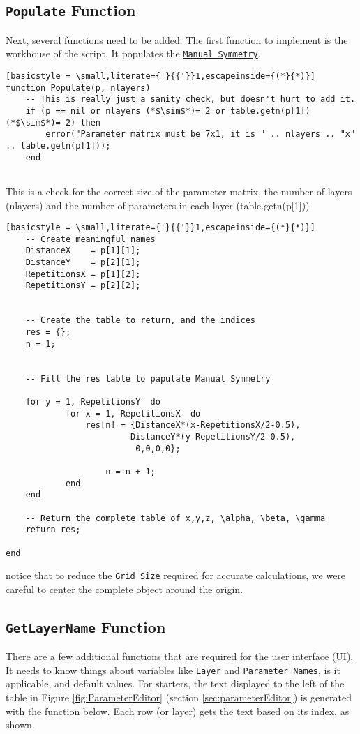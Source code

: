 \documentclass[../D+Manual.tex]{subfiles}
\begin{document}
\subsection{\lstinline|Populate| Function}
Next, several functions need to be added. The first function to implement is the workhouse of the script. It populates the \hyperref [sec:ManualSymmetry] {\texttt{Manual Symmetry}}.
\begin{lstlisting}[basicstyle = \small,literate={'}{{'}}1,escapeinside={(*}{*)}]
function Populate(p, nlayers)
    -- This is really just a sanity check, but doesn't hurt to add it.	
	if (p == nil or nlayers (*$\sim$*)= 2 or table.getn(p[1]) (*$\sim$*)= 2) then				
		error("Parameter matrix must be 7x1, it is " .. nlayers .. "x" .. table.getn(p[1]));
	end
	
\end{lstlisting}
This is a check for the correct size of the parameter matrix, the number of layers (nlayers) and the number of parameters in each layer (table.getn(p[1]))

\begin{lstlisting}[basicstyle = \small,literate={'}{{'}}1,escapeinside={(*}{*)}]
	-- Create meaningful names
	DistanceX    = p[1][1];
	DistanceY    = p[2][1];
	RepetitionsX = p[1][2];
	RepetitionsY = p[2][2];
	

	-- Create the table to return, and the indices
	res = {};
	n = 1;


	-- Fill the res table to papulate Manual Symmetry
	
	for y = 1, RepetitionsY	 do
			for x = 1, RepetitionsX	 do
				res[n] = {DistanceX*(x-RepetitionsX/2-0.5),
			   			 DistanceY*(y-RepetitionsY/2-0.5),
						  0,0,0,0};
						  
					n = n + 1;
			end
	end
	
	-- Return the complete table of x,y,z, \alpha, \beta, \gamma
	return res;

end
\end{lstlisting}

\noindent notice that to reduce the \texttt{Grid Size} required for accurate calculations, we were careful to center the complete object around the origin.

\subsection{\lstinline|GetLayerName| Function}
There are a few additional functions that are required for the user interface (UI). It needs to know things about variables like \texttt{Layer} and \texttt{Parameter Names}, is it applicable, and default values. For starters, the text displayed to the left of the table in Figure \ref{fig:ParameterEditor} (section \ref{sec:parameterEditor}) is generated with the function below. Each row (or layer) gets the text based on its index, as shown.
\end{document}
